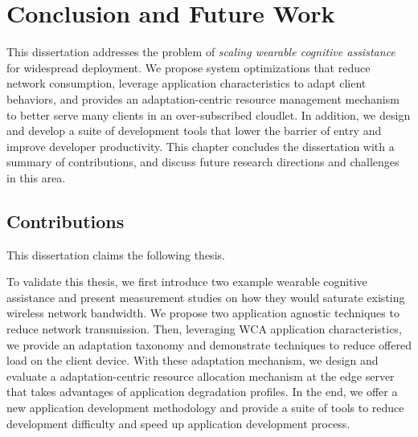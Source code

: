 \chapter{Conclusion and Future Work}

This dissertation addresses the problem of \textit{scaling wearable cognitive
assistance} for widespread deployment. We propose system optimizations that
reduce network consumption, leverage application characteristics to adapt client
behaviors, and provides an adaptation-centric resource management mechanism to
better serve many clients in an over-subscribed cloudlet. In addition, we design
and develop a suite of development tools that lower the barrier of entry and
improve developer productivity. This chapter concludes the dissertation
with a summary of contributions, and discuss future research directions and
challenges in this area.

\section{Contributions}

This dissertation claims the following thesis.

\noindent{}

To validate this thesis, we first introduce two example wearable cognitive
assistance and present measurement studies on how they would saturate existing
wireless network bandwidth. We propose two application agnostic techniques to
reduce network transmission. Then, leveraging WCA application characteristics,
we provide an adaptation taxonomy and demonstrate techniques to reduce offered
load on the client device. With these adaptation mechanism, we design and
evaluate a adaptation-centric resource allocation mechanism at the edge server
that takes advantages of application degradation profiles. In the end, we
offer a new application development methodology and provide a suite of tools
to reduce development difficulty and speed up application development process.

